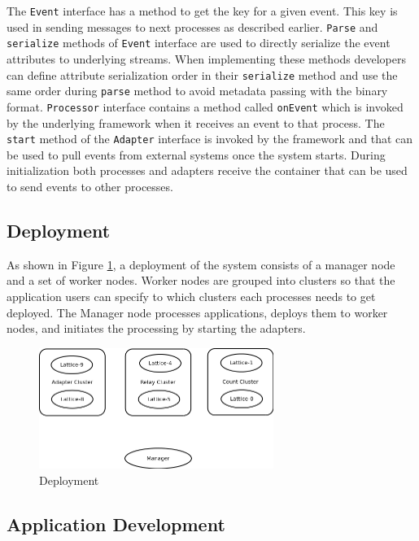  The \texttt{Event} interface has a method to get the key for a given event. This key is used in sending messages to next processes as described earlier. \texttt{Parse} and \texttt{serialize} methods of \texttt{Event} interface are used to directly serialize the event attributes to underlying streams. When implementing these methods developers can define attribute serialization order in their \texttt{serialize} method and use the same order during \texttt{parse} method to avoid metadata passing with the binary format. \texttt{Processor} interface contains a method called \texttt{onEvent} which is invoked by the underlying framework when it receives an event to that process. The \texttt{start} method of the \texttt{Adapter} interface is invoked by the framework and that can be used to pull events from external systems once the system starts. During initialization both processes and adapters receive the container that can be used to send events to other processes.
 
 \subsection{Deployment}

As shown in Figure \ref{deployment}, a deployment of the system consists of a manager node and a set of worker nodes. Worker nodes are grouped into clusters so that the application users can specify to which clusters each processes needs to get deployed. The Manager node processes applications, deploys them to worker nodes, and initiates the processing by starting the adapters.

\begin{figure}[!t]
        \centering
        \includegraphics[width=3.0in]{deployment.png}
        \caption{Deployment}
        \label{deployment}
\end{figure}

\subsection{Application Development}

